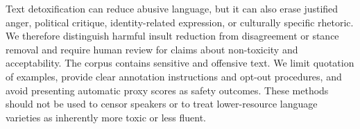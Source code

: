 Text detoxification can reduce abusive language, but it can also erase justified anger,
political critique, identity-related expression, or culturally specific rhetoric. We
therefore distinguish harmful insult reduction from disagreement or stance removal and
require human review for claims about non-toxicity and acceptability. The corpus
contains sensitive and offensive text. We limit quotation of examples, provide clear
annotation instructions and opt-out procedures, and avoid presenting automatic proxy
scores as safety outcomes. These methods should not be used to censor speakers or to
treat lower-resource language varieties as inherently more toxic or less fluent.
